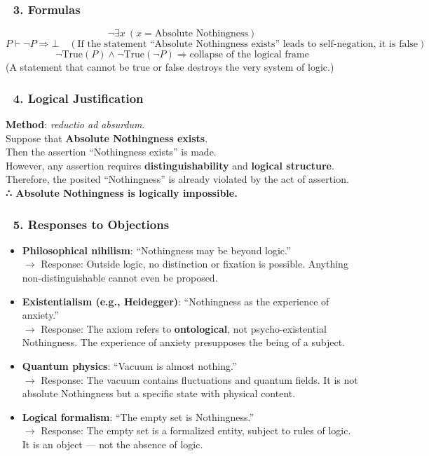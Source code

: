 \documentclass[12pt]{article}
\begin{document}
\subsubsection*{🔹 3. Formulas}
\[
\neg \exists x\ (x = \text{Absolute Nothingness})
\]
\[
P \vdash \neg P \Rightarrow \bot \quad (\text{If the statement ``Absolute Nothingness exists'' leads to self-negation, it is false})
\]
\[
\neg\text{True}(P) \wedge \neg\text{True}(\neg P) \Rightarrow \text{collapse of the logical frame}
\]
(A statement that cannot be true or false destroys the very system of logic.)

\subsubsection*{🔹 4. Logical Justification}
\textbf{Method}: \emph{reductio ad absurdum}.\\
Suppose that \textbf{Absolute Nothingness exists}.\\
Then the assertion ``Nothingness exists'' is made.\\
However, any assertion requires \textbf{distinguishability} and \textbf{logical structure}.\\
Therefore, the posited ``Nothingness'' is already violated by the act of assertion.\\
\textbf{∴ Absolute Nothingness is logically impossible.}

\subsubsection*{🔹 5. Responses to Objections}
\begin{itemize}
\item \textbf{Philosophical nihilism}: ``Nothingness may be beyond logic.''\\
$\rightarrow$ Response: Outside logic, no distinction or fixation is possible. Anything non-distinguishable cannot even be proposed.
\item \textbf{Existentialism (e.g., Heidegger)}: ``Nothingness as the experience of anxiety.''\\
$\rightarrow$ Response: The axiom refers to \textbf{ontological}, not psycho-existential Nothingness. The experience of anxiety presupposes the being of a subject.
\item \textbf{Quantum physics}: ``Vacuum is almost nothing.''\\
$\rightarrow$ Response: The vacuum contains fluctuations and quantum fields. It is not absolute Nothingness but a specific state with physical content.
\item \textbf{Logical formalism}: ``The empty set is Nothingness.''\\
$\rightarrow$ Response: The empty set is a formalized entity, subject to rules of logic. It is an object — not the absence of logic.
\end{itemize}
\end{document}
